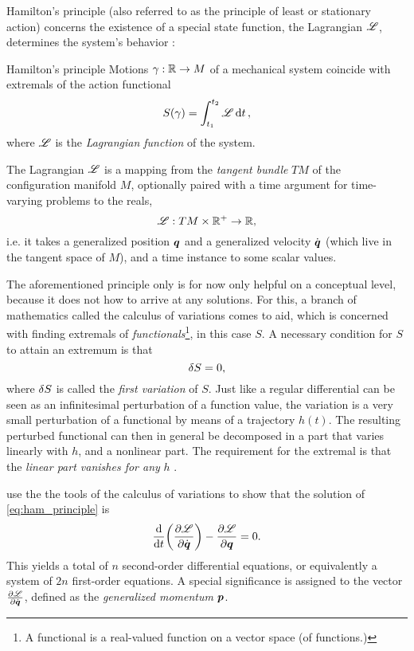 Hamilton's principle (also referred to as the principle of least or stationary action) concerns the existence of a special state function, the Lagrangian $\mathscr{L}$, determines the system's behavior \cite{Arnold1989}:
\begin{thmblock}{Hamilton's principle}
    Motions $\gamma: \mathbb{R} \to M$ of a mechanical system coincide with extremals of the action functional
    \begin{equation}
        S(\gamma) = \int_{t_1}^{t_2} \mathscr{L} \dd{t},
        \label{eq:ham_principle}
    \end{equation}
    where $\mathscr{L}$ is the \emph{Lagrangian function} of the system.
\end{thmblock}
The Lagrangian \(\mathscr{L}\) is a mapping from the \emph{tangent bundle} \(TM\) of the configuration manifold \(M\), optionally paired with a time argument for time-varying problems to the reals,
    \[ \mathscr{L} : TM \times \mathbb{R}^+ \to \mathbb{R}, \]
i.e. it takes a generalized position \(\vb*{q}\) and a generalized velocity \(\dot{\vb*{q}}\) (which live in the tangent space of \(M\)), and a time instance to some scalar values.

The aforementioned principle only is for now only helpful on a conceptual level, because it does not how to arrive at any solutions. For this, a branch of mathematics called the calculus of variations comes to aid, which is concerned with finding extremals of \emph{functionals}\footnote{A functional is a real-valued function on a vector space (of functions.)}, in this case \(S\). A necessary condition for \(S\) to attain an extremum is that 
\[ \var{S} = 0,\]
where \(\var{S}\) is called the \emph{first variation} of \(S\). Just like a regular differential can be seen as an infinitesimal perturbation of a function value, the variation is a very small perturbation of a functional by means of a trajectory \(h(t)\). The resulting perturbed functional can then in general be decomposed in a part that varies linearly with \(h\), and a nonlinear part. The requirement for the extremal is that the \emph{linear part vanishes for any} \(h\) \cite{Arnold1989}.

\citet{Landau1960} use the the tools of the calculus of variations to show that the solution of \cref{eq:ham_principle} is
\[ \dv{}{t}\qty(\pdv{\ensuremath{\mathscr{L}}}{\ensuremath{\dot{\vb*{q}}}}) - \pdv{\ensuremath{\mathscr{L}}}{\ensuremath{\vb*{q}}} = 0. \]
This yields a total of \(n\) second-order differential equations, or equivalently a system of \(2n\) first-order equations. A special significance is assigned to the vector $\pdv{\ensuremath{\mathscr{L}}}{\ensuremath{\dot{\vb*{q}}}}$, defined as the \emph{generalized momentum} $\vb*{p}$.

